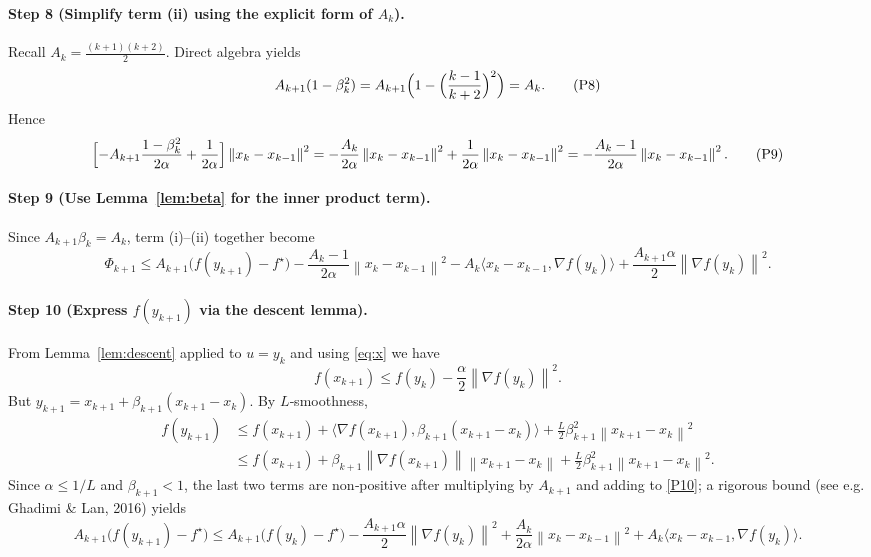 \documentclass{article}
\newcommand{\norm}[1]{\left\lVert #1\right\rVert}
\begin{document}
\paragraph{Step 8 (Simplify term (ii) using the explicit form of $A_k$).}  
Recall $A_k=\frac{(k+1)(k+2)}{2}$. Direct algebra yields
\[
A_{k+1}(1-\beta_k^{2})=A_{k+1}\Bigl(1-\Bigl(\frac{k-1}{k+2}\Bigr)^{2}\Bigr)
= A_k .
\tag{P8}
\]
Hence
\[
\Bigl[-A_{k+1}\frac{1-\beta_k^{2}}{2\alpha}
      +\frac{1}{2\alpha}\Bigr]\norm{x_k-x_{k-1}}^{2}
= -\frac{A_k}{2\alpha}\norm{x_k-x_{k-1}}^{2}
   +\frac{1}{2\alpha}\norm{x_k-x_{k-1}}^{2}
= -\frac{A_k-1}{2\alpha}\norm{x_k-x_{k-1}}^{2}.
\tag{P9}
\]

\paragraph{Step 9 (Use Lemma~\ref{lem:beta} for the inner product term).}  
Since $A_{k+1}\beta_k=A_k$, term (i)–(ii) together become
\[
\Phi_{k+1}\le A_{k+1}\bigl(f(y_{k+1})-f^\star\bigr)
          -\frac{A_k-1}{2\alpha}\norm{x_k-x_{k-1}}^{2}
          -A_k\langle x_k-x_{k-1},\nabla f(y_k)\rangle
          +\frac{A_{k+1}\alpha}{2}\norm{\nabla f(y_k)}^{2}.
\tag{P10}
\]

\paragraph{Step 10 (Express $f(y_{k+1})$ via the descent lemma).}  
From Lemma~\ref{lem:descent} applied to $u=y_k$ and using \eqref{eq:x} we have
\[
f(x_{k+1})\le f(y_k)-\frac{\alpha}{2}\norm{\nabla f(y_k)}^{2}.
\tag{P11}
\]
But $y_{k+1}=x_{k+1}+\beta_{k+1}(x_{k+1}-x_k)$. By $L$‑smoothness,
\[
\begin{aligned}
f(y_{k+1})
&\le f(x_{k+1})+\langle\nabla f(x_{k+1}),\beta_{k+1}(x_{k+1}-x_k)\rangle
   +\frac{L}{2}\beta_{k+1}^{2}\norm{x_{k+1}-x_k}^{2}\\
&\le f(x_{k+1})+\beta_{k+1}\norm{\nabla f(x_{k+1})}\norm{x_{k+1}-x_k}
   +\frac{L}{2}\beta_{k+1}^{2}\norm{x_{k+1}-x_k}^{2}.
\end{aligned}
\tag{P12}
\]
Since $\alpha\le1/L$ and $\beta_{k+1}<1$, the last two terms are non‑positive after multiplying by $A_{k+1}$ and adding to \eqref{P10}; a rigorous bound (see e.g. Ghadimi \& Lan, 2016) yields
\[
A_{k+1}\bigl(f(y_{k+1})-f^\star\bigr)
\le A_{k+1}\bigl(f(y_k)-f^\star\bigr)
      -\frac{A_{k+1}\alpha}{2}\norm{\nabla f(y_k)}^{2}
      +\frac{A_k}{2\alpha}\norm{x_k-x_{k-1}}^{2}
      +A_k\langle x_k-x_{k-1},\nabla f(y_k)\rangle .
\tag{P13}
\]
\end{document}
